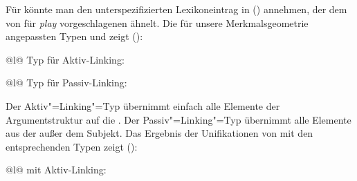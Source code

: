 \noindent
Für  könnte man den unterspezifizierten Lexikoneintrag in ()
annehmen, der dem von \citet[]{Koenig99a} für \emph{play} vorgeschlagenen ähnelt.
\ea
{}
\z
{}
Die für unsere Merkmalsgeometrie angepassten Typen  und  zeigt ():
\eal
\ex 
\begin{tabular}[t]{@{}l@{}}
Typ für Aktiv-Linking:\\
\end{tabular}
\ex\label{constr-passive-linking}
\begin{tabular}[t]{@{}l@{}} 
Typ für Passiv-Linking:\\
\end{tabular}
\zl
Der Aktiv"=Linking"=Typ übernimmt einfach alle Elemente der Argumentstruktur auf die \compsl.
Der Passiv"=Linking"=Typ übernimmt alle Elemente aus der \argstl außer dem Subjekt.
Das Ergebnis der Unifikationen von  mit den entsprechenden Typen zeigt ():
\eal
\ex 
\begin{tabular}[t]{@{}l@{}}
 mit Aktiv-Linking:\\
\end{tabular}
